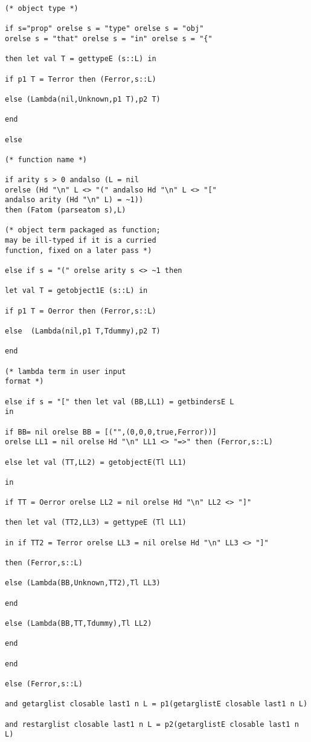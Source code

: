\documentclass[12pt]{article}
\begin{document}
\begin{verbatim}
(* object type *)

if s="prop" orelse s = "type" orelse s = "obj"
orelse s = "that" orelse s = "in" orelse s = "{"

then let val T = gettypeE (s::L) in

if p1 T = Terror then (Ferror,s::L)

else (Lambda(nil,Unknown,p1 T),p2 T)

end

else

(* function name *)

if arity s > 0 andalso (L = nil 
orelse (Hd "\n" L <> "(" andalso Hd "\n" L <> "["
andalso arity (Hd "\n" L) = ~1))
then (Fatom (parseatom s),L)

(* object term packaged as function;
may be ill-typed if it is a curried
function, fixed on a later pass *)

else if s = "(" orelse arity s <> ~1 then

let val T = getobject1E (s::L) in

if p1 T = Oerror then (Ferror,s::L)

else  (Lambda(nil,p1 T,Tdummy),p2 T)

end

(* lambda term in user input
format *)

else if s = "[" then let val (BB,LL1) = getbindersE L
in

if BB= nil orelse BB = [("",(0,0,0,true,Ferror))]
orelse LL1 = nil orelse Hd "\n" LL1 <> "=>" then (Ferror,s::L)

else let val (TT,LL2) = getobjectE(Tl LL1) 

in

if TT = Oerror orelse LL2 = nil orelse Hd "\n" LL2 <> "]"

then let val (TT2,LL3) = gettypeE (Tl LL1)

in if TT2 = Terror orelse LL3 = nil orelse Hd "\n" LL3 <> "]"

then (Ferror,s::L)

else (Lambda(BB,Unknown,TT2),Tl LL3)

end

else (Lambda(BB,TT,Tdummy),Tl LL2)

end

end

else (Ferror,s::L)

and getarglist closable last1 n L = p1(getarglistE closable last1 n L)

and restarglist closable last1 n L = p2(getarglistE closable last1 n L)


\end{verbatim}
\end{document}

